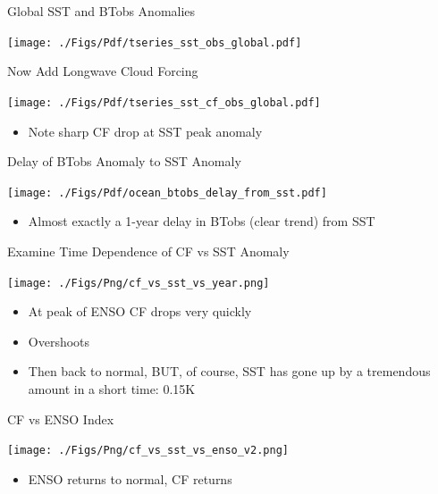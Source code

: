 \documentclass[10pt,t]{beamer}
\begin{document}
\begin{frame}[label={sec:org0ddce1e}]{Global SST and BTobs Anomalies}
\begin{center}
\texttt{[image: ./Figs/Pdf/tseries\_sst\_obs\_global.pdf]}
\end{center}
\end{frame}


\begin{frame}[label={sec:org4293227}]{Now Add Longwave Cloud Forcing}
\begin{center}
\texttt{[image: ./Figs/Pdf/tseries\_sst\_cf\_obs\_global.pdf]}
\end{center}

\small 
\begin{itemize}
\item Note sharp CF drop at SST peak anomaly
\end{itemize}
\end{frame}

\begin{frame}[label={sec:org313609b}]{Delay of BTobs Anomaly to SST Anomaly}
\begin{center}
\texttt{[image: ./Figs/Pdf/ocean\_btobs\_delay\_from\_sst.pdf]}
\end{center}

\small 
\begin{itemize}
\item Almost exactly a 1-year delay in BTobs (clear trend) from SST
\end{itemize}
\end{frame}

\begin{frame}[label={sec:org16736e3}]{Examine Time Dependence of CF vs SST Anomaly}
\vspace{-0.15in}
\begin{center}
\texttt{[image: ./Figs/Png/cf\_vs\_sst\_vs\_year.png]}
\end{center}

\vspace{-0.15in}
\footnotesize
\begin{itemize}
\item At peak of ENSO CF drops very quickly
\item Overshoots
\item Then back to normal, BUT, of course, SST has gone up by a tremendous amount in a short time: 0.15K
\end{itemize}
\end{frame}

\begin{frame}[label={sec:org6f50560}]{CF vs ENSO Index}
\begin{center}
\texttt{[image: ./Figs/Png/cf\_vs\_sst\_vs\_enso\_v2.png]}
\end{center}

\footnotesize
\begin{itemize}
\item ENSO returns to normal, CF returns
\end{itemize}
\end{frame}
\end{document}
